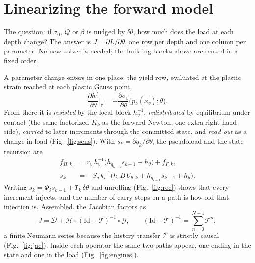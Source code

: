 \documentclass[11pt]{article}
\begin{document}
\section{Linearizing the forward model}
The question: if $\sigma_0$, $Q$ or $\beta$ is nudged by $\delta\theta$, how much does the load at each depth
change? The answer is $J=\partial L/\partial\theta$, one row per depth and one column per parameter. No new
solver is needed; the building blocks above are reused in a fixed order.

A parameter change enters in one place: the yield row, evaluated at the plastic strain reached at each
plastic Gauss point,
\begin{equation}
  \frac{\partial h^f}{\partial\theta}\Big|_g = -\frac{\partial\sigma_y}{\partial\theta}\big(p_k(x_g);\theta\big).
\end{equation}
From there it is \emph{resisted} by the local block $h_v^{-1}$, \emph{redistributed} by equilibrium under
contact (the same factorized $K_k$ as the forward Newton, one extra right-hand side), \emph{carried} to later
increments through the committed state, and \emph{read out} as a change in load (Fig.~\ref{fig:sens}).
With $s_k=\partial q_k/\partial\theta$, the pseudoload and the state recursion are
\begin{align}
  f_{H,k} &= r_v\,h_v^{-1}\big(h_{q_{k-1}}s_{k-1}+h_\theta\big) + f_{\Gamma,k},\\
  s_k &= -S_q\,h_v^{-1}\big(h_\varepsilon B\,U_{\theta,k} + h_{q_{k-1}}s_{k-1} + h_\theta\big).
\end{align}
Writing $s_k=\Phi_k s_{k-1}+\Upsilon_k\,\delta\theta$ and unrolling (Fig.~\ref{fig:rec}) shows that every
increment injects, and the number of carry steps on a path is how old that injection is. Assembled, the
Jacobian factors as
\begin{equation}
  J = \mathcal D + \mathcal H\circ(\mathrm{Id}-\mathcal T)^{-1}\circ\mathcal G ,
  \qquad (\mathrm{Id}-\mathcal T)^{-1} = \textstyle\sum_{n=0}^{N-1}\mathcal T^n ,
\end{equation}
a finite Neumann series because the history transfer $\mathcal T$ is strictly causal (Fig.~\ref{fig:jac}).
Inside each operator the same two paths appear, one ending in the state and one in the load
(Fig.~\ref{fig:engines}).
\end{document}
